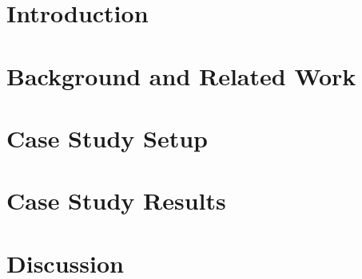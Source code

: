 \begin{abstract}


\end{abstract}




\section{Introduction}
\label{sec:intro}


\section{Background and Related Work}
\label{sec:related}


\section{Case Study Setup}
\label{sec:case}



\section{Case Study Results}

\label{sec:results}


\section{Discussion}
\label{sec:discussion}

	
